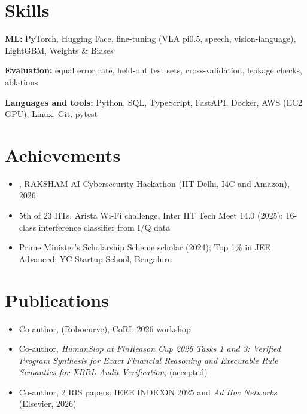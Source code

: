 \documentclass[10pt]{article}
\begin{document}
\section{Skills}
\textbf{ML:} PyTorch, Hugging Face, fine-tuning (VLA pi0.5, speech, vision-language), LightGBM, Weights \& Biases\par
\textbf{Evaluation:} equal error rate, held-out test sets, cross-validation, leakage checks, ablations\par
\textbf{Languages and tools:} Python, SQL, TypeScript, FastAPI, Docker, AWS (EC2 GPU), Linux, Git, pytest\par

\section{Achievements}
\begin{itemize}
\item {}, RAKSHAM AI Cybersecurity Hackathon (IIT Delhi, I4C and Amazon), 2026
\item 5th of 23 IITs, Arista Wi-Fi challenge, Inter IIT Tech Meet 14.0 (2025): 16-class interference classifier from I/Q data
\item Prime Minister's Scholarship Scheme scholar (2024); Top 1\% in JEE Advanced; YC Startup School, Bengaluru
\end{itemize}

\section{Publications}
\begin{itemize}
\item Co-author,  (Robocurve), CoRL 2026 workshop
\item Co-author, \textit{HumanSlop at FinReason Cup 2026 Tasks 1 and 3: Verified Program Synthesis for Exact Financial Reasoning and Executable Rule Semantics for XBRL Audit Verification},  (accepted)
\item Co-author, 2 RIS papers: IEEE INDICON 2025 and \textit{Ad Hoc Networks} (Elsevier, 2026)
\end{itemize}
\end{document}
